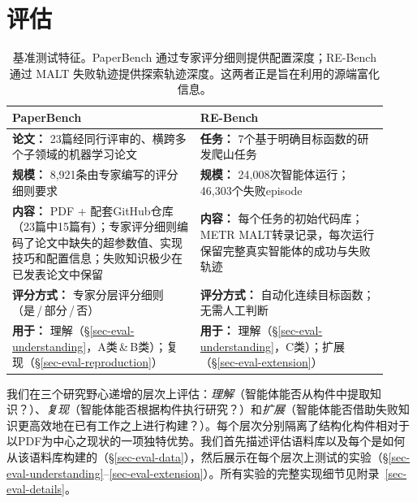 \section{评估}
\label{sec-eval}

\begin{table}[t]
  \centering
  \small
  \begin{tabular}{@{} p{0.46\linewidth} | p{0.46\linewidth} @{}}
  \toprule
  \textbf{PaperBench}~\citep{starace2025paperbench} & \textbf{RE-Bench}~\citep{wijk2025rebench} \\
  \midrule
  \textbf{论文：} 23篇经同行评审的、横跨多个子领域的机器学习论文 &
  \textbf{任务：} 7个基于明确目标函数的研发爬山任务 \\
  \midrule
  \textbf{规模：} 8,921条由专家编写的评分细则要求 &
  \textbf{规模：} 24,008次智能体运行；46,303个失败episode \\
  \midrule
  \textbf{内容：} PDF + 配套GitHub仓库（23篇中15篇有）；专家评分细则编码了论文中缺失的超参数值、实现技巧和配置信息；失败知识极少在已发表论文中保留 &
  \textbf{内容：} 每个任务的初始代码库；METR MALT转录记录，每次运行保留完整真实智能体的成功与失败轨迹 \\
  \midrule
  \textbf{评分方式：} 专家分层评分细则（是\,/\,部分\,/\,否） &
  \textbf{评分方式：} 自动化连续目标函数；无需人工判断 \\
  \midrule
  \textbf{用于：} 理解（\S\ref{sec-eval-understanding}，A类\,\&\,B类）；复现（\S\ref{sec-eval-reproduction}） &
  \textbf{用于：} 理解（\S\ref{sec-eval-understanding}，C类）；扩展（\S\ref{sec-eval-extension}） \\
  \bottomrule
  \end{tabular}
  \caption{基准测试特征。PaperBench 通过专家评分细则提供配置深度；RE-Bench 通过 MALT 失败轨迹提供探索轨迹深度。这两者正是\ara{}旨在利用的源端富化信息。}
  \label{tbl-benchmarks}
  \end{table}
我们在三个研究野心递增的层次上评估\ara{}：\emph{理解}（智能体能否从构件中提取知识？）、\emph{复现}（智能体能否根据构件执行研究？）和\emph{扩展}（智能体能否借助失败知识更高效地在已有工作之上进行构建？）。每个层次分别隔离了结构化构件相对于以PDF为中心之现状的一项独特优势。我们首先描述评估语料库以及每个\ara{}是如何从该语料库构建的（\S\ref{sec-eval-data}），然后展示在每个层次上测试\ara{}的实验（\S\ref{sec-eval-understanding}--\ref{sec-eval-extension}）。所有实验的完整实现细节见附录~\ref{sec-eval-details}。


